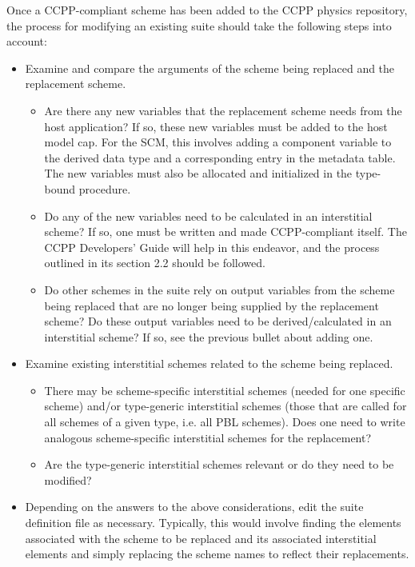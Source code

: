 Once a CCPP-compliant scheme has been added to the CCPP physics repository, the process for modifying an existing suite should take the following steps into account:

\begin{itemize}
\item Examine and compare the arguments of the scheme being replaced and the replacement scheme.
\begin{itemize}
\item Are there any new variables that the replacement scheme needs from the host application? If so, these new variables must be added to the host model cap. For the SCM, this involves adding a component variable to the  derived data type and a corresponding entry in the metadata table. The new variables must also be allocated and initialized in the  type-bound procedure. 
\item Do any of the new variables need to be calculated in an interstitial scheme? If so, one must be written and made CCPP-compliant itself. The CCPP Developers' Guide will help in this endeavor, and the process outlined in its section 2.2 should be followed. 
\item Do other schemes in the suite rely on output variables from the scheme being replaced that are no longer being supplied by the replacement scheme? Do these output variables need to be derived/calculated in an interstitial scheme? If so, see the previous bullet about adding one.
\end{itemize}
\item Examine existing interstitial schemes related to the scheme being replaced. 
\begin{itemize}
\item There may be scheme-specific interstitial schemes (needed for one specific scheme) and/or type-generic interstitial schemes (those that are called for all schemes of a given type, i.e. all PBL schemes). Does one need to write analogous scheme-specific interstitial schemes for the replacement? 
\item Are the type-generic interstitial schemes relevant or do they need to be modified?
\end{itemize}
\item Depending on the answers to the above considerations, edit the suite definition file as necessary. Typically, this would involve finding the  elements associated with the scheme to be replaced and its associated interstitial  elements and simply replacing the scheme names to reflect their replacements.
\end{itemize}

